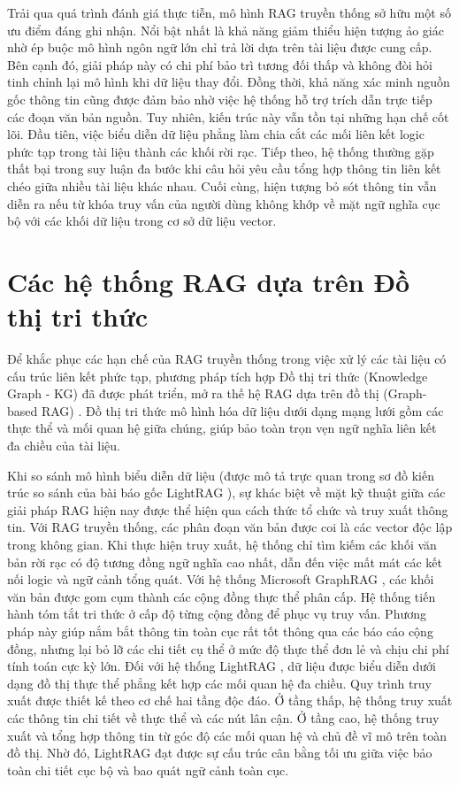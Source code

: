 \indent Trải qua quá trình đánh giá thực tiễn, mô hình RAG truyền thống sở hữu một số ưu điểm đáng ghi nhận. Nổi bật nhất là khả năng giảm thiểu hiện tượng ảo giác nhờ ép buộc mô hình ngôn ngữ lớn chỉ trả lời dựa trên tài liệu được cung cấp. Bên cạnh đó, giải pháp này có chi phí bảo trì tương đối thấp và không đòi hỏi tinh chỉnh lại mô hình khi dữ liệu thay đổi. Đồng thời, khả năng xác minh nguồn gốc thông tin cũng được đảm bảo nhờ việc hệ thống hỗ trợ trích dẫn trực tiếp các đoạn văn bản nguồn. Tuy nhiên, kiến trúc này vẫn tồn tại những hạn chế cốt lõi. Đầu tiên, việc biểu diễn dữ liệu phẳng làm chia cắt các mối liên kết logic phức tạp trong tài liệu thành các khối rời rạc. Tiếp theo, hệ thống thường gặp thất bại trong suy luận đa bước khi câu hỏi yêu cầu tổng hợp thông tin liên kết chéo giữa nhiều tài liệu khác nhau. Cuối cùng, hiện tượng bỏ sót thông tin vẫn diễn ra nếu từ khóa truy vấn của người dùng không khớp về mặt ngữ nghĩa cục bộ với các khối dữ liệu trong cơ sở dữ liệu vector.

\section{Các hệ thống RAG dựa trên Đồ thị tri thức}
\indent Để khắc phục các hạn chế của RAG truyền thống trong việc xử lý các tài liệu có cấu trúc liên kết phức tạp, phương pháp tích hợp Đồ thị tri thức (Knowledge Graph - KG) đã được phát triển, mở ra thế hệ RAG dựa trên đồ thị (Graph-based RAG) \cite{hogan2021knowledge}. Đồ thị tri thức mô hình hóa dữ liệu dưới dạng mạng lưới gồm các thực thể và mối quan hệ giữa chúng, giúp bảo toàn trọn vẹn ngữ nghĩa liên kết đa chiều của tài liệu.

\indent Khi so sánh mô hình biểu diễn dữ liệu (được mô tả trực quan trong sơ đồ kiến trúc so sánh của bài báo gốc LightRAG \cite{guo2025lightrag}), sự khác biệt về mặt kỹ thuật giữa các giải pháp RAG hiện nay được thể hiện qua cách thức tổ chức và truy xuất thông tin. Với RAG truyền thống, các phân đoạn văn bản được coi là các vector độc lập trong không gian. Khi thực hiện truy xuất, hệ thống chỉ tìm kiếm các khối văn bản rời rạc có độ tương đồng ngữ nghĩa cao nhất, dẫn đến việc mất mát các kết nối logic và ngữ cảnh tổng quát. Với hệ thống Microsoft GraphRAG \cite{edge2024graphrag}, các khối văn bản được gom cụm thành các cộng đồng thực thể phân cấp. Hệ thống tiến hành tóm tắt tri thức ở cấp độ từng cộng đồng để phục vụ truy vấn. Phương pháp này giúp nắm bắt thông tin toàn cục rất tốt thông qua các báo cáo cộng đồng, nhưng lại bỏ lỡ các chi tiết cụ thể ở mức độ thực thể đơn lẻ và chịu chi phí tính toán cực kỳ lớn. Đối với hệ thống LightRAG \cite{guo2025lightrag}, dữ liệu được biểu diễn dưới dạng đồ thị thực thể phẳng kết hợp các mối quan hệ đa chiều. Quy trình truy xuất được thiết kế theo cơ chế hai tầng độc đáo. Ở tầng thấp, hệ thống truy xuất các thông tin chi tiết về thực thể và các nút lân cận. Ở tầng cao, hệ thống truy xuất và tổng hợp thông tin từ góc độ các mối quan hệ và chủ đề vĩ mô trên toàn đồ thị. Nhờ đó, LightRAG đạt được sự cấu trúc cân bằng tối ưu giữa việc bảo toàn chi tiết cục bộ và bao quát ngữ cảnh toàn cục.

